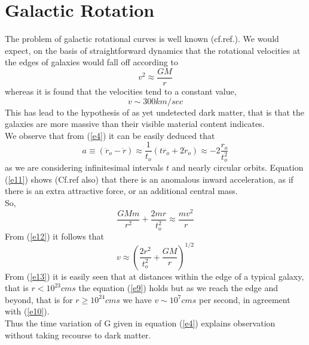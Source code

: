 \section{Galactic Rotation}
The problem of galactic rotational curves is well known (cf.ref.\cite{r8}).
We would expect, on the basis of straightforward dynamics that the rotational
velocities at the edges of galaxies would fall off according to
\begin{equation}
v^2 \approx \frac{GM}{r}\label{e9}
\end{equation}
whereas it is found that the velocities tend to a constant value,
\begin{equation}
v \sim 300km/sec\label{e10}
\end{equation}
This has lead to the hypothesis of as yet undetected dark matter, that is that
the galaxies are more massive than their visible material content indicates.\\
We observe that from (\ref{e4}) it can be easily deduced that
\begin{equation}
a \equiv (\ddot{r}_{o} - \ddot{r}) \approx \frac{1}{t_o} (t\ddot{r_o} + 2\dot r_o)
\approx -2 \frac{r_o}{t^2_o}\label{e11}
\end{equation}
as we are considering infinitesimal intervals $t$ and nearly circular orbits.
Equation (\ref{e11}) shows (Cf.ref\cite{r1} also) that there is an anomalous inward acceleration, as
if there is an extra attractive force, or an additional central mass.\\
So,
\begin{equation}
\frac{GMm}{r^2} + \frac{2mr}{t^2_o} \approx \frac{mv^2}{r}\label{e12}
\end{equation}
From (\ref{e12}) it follows that
\begin{equation}
v \approx \left(\frac{2r^2}{t^2_o} + \frac{GM}{r}\right)^{1/2}
\label{e13}
\end{equation}
From (\ref{e13}) it is easily seen that at distances within the edge of a typical
galaxy, that is $r < 10^{23}cms$ the equation (\ref{e9}) holds but as we reach
the edge and beyond, that is for $r \geq 10^{24}cms$ we have $v \sim 10^7 cms$
per second, in agreement with (\ref{e10}).\\
Thus the time variation of G given in equation (\ref{e4}) explains observation
without taking recourse to dark matter.
